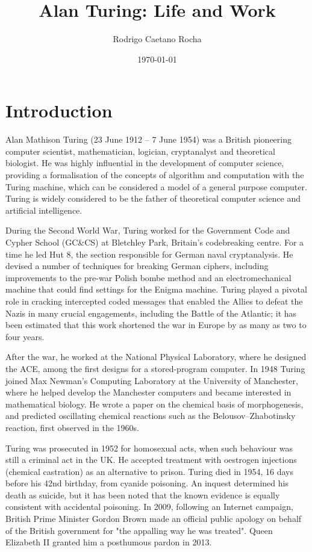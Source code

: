 \documentclass[a4paper,12pt]{article}
\title{Alan Turing: Life and Work}
\author{Rodrigo Caetano Rocha}
\date{\today}
\begin{document}
\maketitle

\section{Introduction}

Alan Mathison Turing (23 June 1912 – 7 June 1954) was a British pioneering computer scientist, mathematician, logician, cryptanalyst and theoretical biologist. He was highly influential in the development of computer science, providing a formalisation of the concepts of algorithm and computation with the Turing machine, which can be considered a model of a general purpose computer. Turing is widely considered to be the father of theoretical computer science and artificial intelligence.

During the Second World War, Turing worked for the Government Code and Cypher School (GC\&CS) at Bletchley Park, Britain's codebreaking centre. For a time he led Hut 8, the section responsible for German naval cryptanalysis. He devised a number of techniques for breaking German ciphers, including improvements to the pre-war Polish bombe method and an electromechanical machine that could find settings for the Enigma machine. Turing played a pivotal role in cracking intercepted coded messages that enabled the Allies to defeat the Nazis in many crucial engagements, including the Battle of the Atlantic; it has been estimated that this work shortened the war in Europe by as many as two to four years.

After the war, he worked at the National Physical Laboratory, where he designed the ACE, among the first designs for a stored-program computer. In 1948 Turing joined Max Newman's Computing Laboratory at the University of Manchester, where he helped develop the Manchester computers and became interested in mathematical biology. He wrote a paper on the chemical basis of morphogenesis, and predicted oscillating chemical reactions such as the Belousov–Zhabotinsky reaction, first observed in the 1960s.

Turing was prosecuted in 1952 for homosexual acts, when such behaviour was still a criminal act in the UK. He accepted treatment with oestrogen injections (chemical castration) as an alternative to prison. Turing died in 1954, 16 days before his 42nd birthday, from cyanide poisoning. An inquest determined his death as suicide, but it has been noted that the known evidence is equally consistent with accidental poisoning. In 2009, following an Internet campaign, British Prime Minister Gordon Brown made an official public apology on behalf of the British government for "the appalling way he was treated". Queen Elizabeth II granted him a posthumous pardon in 2013.
\end{document}
